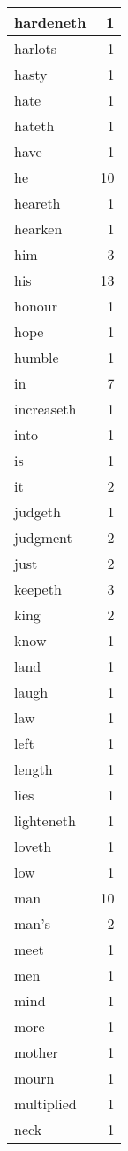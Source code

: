 \begin{center}
\begin{longtable}{l|r}
hardeneth & 1\\ \hline 
harlots & 1\\ \hline 
hasty & 1\\ \hline 
hate & 1\\ \hline 
hateth & 1\\ \hline 
have & 1\\ \hline 
he & 10\\ \hline 
heareth & 1\\ \hline 
hearken & 1\\ \hline 
him & 3\\ \hline 
his & 13\\ \hline 
honour & 1\\ \hline 
hope & 1\\ \hline 
humble & 1\\ \hline 
in & 7\\ \hline 
increaseth & 1\\ \hline 
into & 1\\ \hline 
is & 1\\ \hline 
it & 2\\ \hline 
judgeth & 1\\ \hline 
judgment & 2\\ \hline 
just & 2\\ \hline 
keepeth & 3\\ \hline 
king & 2\\ \hline 
know & 1\\ \hline 
land & 1\\ \hline 
laugh & 1\\ \hline 
law & 1\\ \hline 
left & 1\\ \hline 
length & 1\\ \hline 
lies & 1\\ \hline 
lighteneth & 1\\ \hline 
loveth & 1\\ \hline 
low & 1\\ \hline 
man & 10\\ \hline 
man's & 2\\ \hline 
meet & 1\\ \hline 
men & 1\\ \hline 
mind & 1\\ \hline 
more & 1\\ \hline 
mother & 1\\ \hline 
mourn & 1\\ \hline 
multiplied & 1\\ \hline 
neck & 1\\ \hline 

\end{longtable}
\end{center}

